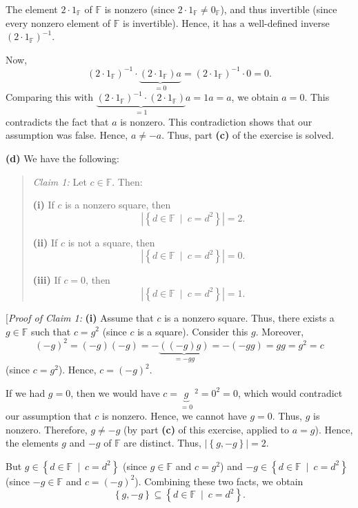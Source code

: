 \documentclass[paper=a4, fontsize=12pt]{scrartcl}%
\theoremstyle{plainsl}
\theoremstyle{definition}
\theoremstyle{remark}
\newenvironment{statement}{\begin{quote}}{\end{quote}}
\begin{document}
The element $2\cdot1_{\mathbb{F}}$ of $\mathbb{F}$ is nonzero (since
$2\cdot1_{\mathbb{F}}\neq0_{\mathbb{F}}$), and thus invertible (since every
nonzero element of $\mathbb{F}$ is invertible). Hence, it has a well-defined
inverse $\left(  2\cdot1_{\mathbb{F}}\right)  ^{-1}$.

Now,%
\[
\left(  2\cdot1_{\mathbb{F}}\right)  ^{-1}\cdot\underbrace{\left(
2\cdot1_{\mathbb{F}}\right)  a}_{=0}=\left(  2\cdot1_{\mathbb{F}}\right)
^{-1}\cdot0=0.
\]
Comparing this with $\underbrace{\left(  2\cdot1_{\mathbb{F}}\right)
^{-1}\cdot\left(  2\cdot1_{\mathbb{F}}\right)  }_{=1}a=1a=a$, we obtain $a=0$.
This contradicts the fact that $a$ is nonzero. This contradiction shows that
our assumption was false. Hence, $a\neq-a$. Thus, part \textbf{(c)} of the
exercise is solved.

\bigskip

\textbf{(d)} We have the following:

\begin{statement}
\textit{Claim 1:} Let $c\in\mathbb{F}$. Then:

\textbf{(i)} If $c$ is a nonzero square, then%
\[
\left\vert \left\{  d\in\mathbb{F}\ \mid\ c=d^{2}\right\}  \right\vert =2.
\]


\textbf{(ii)} If $c$ is not a square, then%
\[
\left\vert \left\{  d\in\mathbb{F}\ \mid\ c=d^{2}\right\}  \right\vert =0.
\]


\textbf{(iii)} If $c=0$, then%
\[
\left\vert \left\{  d\in\mathbb{F}\ \mid\ c=d^{2}\right\}  \right\vert =1.
\]

\end{statement}

[\textit{Proof of Claim 1:} \textbf{(i)} Assume that $c$ is a nonzero square.
Thus, there exists a $g\in\mathbb{F}$ such that $c=g^{2}$ (since $c$ is a
square). Consider this $g$. Moreover,
\[
\left(  -g\right)  ^{2}=\left(  -g\right)  \left(  -g\right)
=-\underbrace{\left(  \left(  -g\right)  g\right)  }_{=-gg}=-\left(
-gg\right)  =gg=g^{2}=c
\]
(since $c=g^{2}$). Hence, $c=\left(  -g\right)  ^{2}$.

If we had $g=0$, then we would have $c=\underbrace{g}_{=0}\ ^{2}=0^{2}=0$,
which would contradict our assumption that $c$ is nonzero. Hence, we cannot
have $g=0$. Thus, $g$ is nonzero. Therefore, $g\neq-g$ (by part \textbf{(c)}
of this exercise, applied to $a=g$). Hence, the elements $g$ and $-g$ of
$\mathbb{F}$ are distinct. Thus, $\left\vert \left\{  g,-g\right\}
\right\vert =2$.

But $g\in\left\{  d\in\mathbb{F}\ \mid\ c=d^{2}\right\}  $ (since
$g\in\mathbb{F}$ and $c=g^{2}$) and $-g\in\left\{  d\in\mathbb{F}%
\ \mid\ c=d^{2}\right\}  $ (since $-g\in\mathbb{F}$ and $c=\left(  -g\right)
^{2}$). Combining these two facts, we obtain
\begin{equation}
\left\{  g,-g\right\}  \subseteq\left\{  d\in\mathbb{F}\ \mid\ c=d^{2}%
\right\}  . \label{sol.ffields.squares1.c1.pf.1}%
\end{equation}
\end{document}
